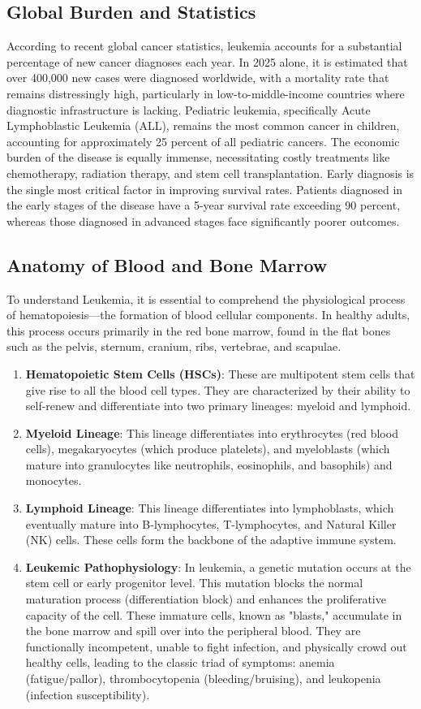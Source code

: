 \documentclass[twocolumn,10pt,a4paper]{article}
\begin{document}
\subsection{Global Burden and Statistics}
According to recent global cancer statistics, leukemia accounts for a substantial percentage of new cancer diagnoses each year. In 2025 alone, it is estimated that over 400,000 new cases were diagnosed worldwide, with a mortality rate that remains distressingly high, particularly in low-to-middle-income countries where diagnostic infrastructure is lacking. Pediatric leukemia, specifically Acute Lymphoblastic Leukemia (ALL), remains the most common cancer in children, accounting for approximately 25 percent of all pediatric cancers. The economic burden of the disease is equally immense, necessitating costly treatments like chemotherapy, radiation therapy, and stem cell transplantation. Early diagnosis is the single most critical factor in improving survival rates. Patients diagnosed in the early stages of the disease have a 5-year survival rate exceeding 90 percent, whereas those diagnosed in advanced stages face significantly poorer outcomes.

\subsection{Anatomy of Blood and Bone Marrow}
To understand Leukemia, it is essential to comprehend the physiological process of hematopoiesis—the formation of blood cellular components. In healthy adults, this process occurs primarily in the red bone marrow, found in the flat bones such as the pelvis, sternum, cranium, ribs, vertebrae, and scapulae.
\begin{enumerate}
    \item \textbf{Hematopoietic Stem Cells (HSCs)}: These are multipotent stem cells that give rise to all the blood cell types. They are characterized by their ability to self-renew and differentiate into two primary lineages: myeloid and lymphoid.
    \item \textbf{Myeloid Lineage}: This lineage differentiates into erythrocytes (red blood cells), megakaryocytes (which produce platelets), and myeloblasts (which mature into granulocytes like neutrophils, eosinophils, and basophils) and monocytes.
    \item \textbf{Lymphoid Lineage}: This lineage differentiates into lymphoblasts, which eventually mature into B-lymphocytes, T-lymphocytes, and Natural Killer (NK) cells. These cells form the backbone of the adaptive immune system.
    \item \textbf{Leukemic Pathophysiology}: In leukemia, a genetic mutation occurs at the stem cell or early progenitor level. This mutation blocks the normal maturation process (differentiation block) and enhances the proliferative capacity of the cell. These immature cells, known as "blasts," accumulate in the bone marrow and spill over into the peripheral blood. They are functionally incompetent, unable to fight infection, and physically crowd out healthy cells, leading to the classic triad of symptoms: anemia (fatigue/pallor), thrombocytopenia (bleeding/bruising), and leukopenia (infection susceptibility).
\end{enumerate}
\end{document}
